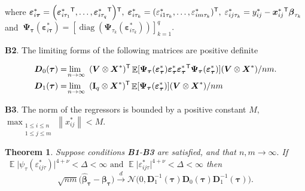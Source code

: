 \documentclass[15pt,a4paper]{article}
\DeclareMathOperator{\E}{\mathbb{E}}
\DeclareMathOperator{\diag}{diag}
\newcommand{\norm}[1]{\left\lVert#1\right\rVert}
\newcommand{\transpose}{{}^{\text{\sffamily T}}}
\newtheorem{theorem}{Theorem}%
\begin{document}
where  $\boldsymbol{\varepsilon}_{i\boldsymbol{\tau}}^{*}=\Big(\boldsymbol{\varepsilon}_{i\tau_1}^{*}\transpose,\ldots,\boldsymbol{\varepsilon}_{i\tau_q}^{*}\transpose\Big)\transpose, \; \boldsymbol{\varepsilon}_{i\tau_k}^{*}=(\varepsilon_{i1\tau_k}^{*},\ldots,\varepsilon_{im\tau_k}^{*})\transpose, \; \varepsilon_{ij\tau_k}^{*}=y_{ij}^{*}-\boldsymbol{x}_{ij}^{*}\transpose\boldsymbol{\beta}_{\tau_k} \ $ and
$ \ \boldsymbol{\Psi}_{\boldsymbol{\tau}}(\boldsymbol{\varepsilon}_{i\boldsymbol{\tau}}^{*})=
[\diag(\boldsymbol{\Psi}_{\tau_k}(\boldsymbol{\varepsilon}_{i{\tau_k}}^{*}))]_{k=1}^{q}.$

\textbf{B2}. The limiting forms of the following matrices are positive definite

\begin{equation*}
\begin{split}
    {}& \boldsymbol{D}_0 (\boldsymbol{\tau})= \lim_{\substack{ \mathllap{n} \rightarrow \mathrlap{\infty} }} \quad
     (\boldsymbol{V}\otimes\boldsymbol{X}^{*})\transpose\E[\boldsymbol{\Psi}_{\boldsymbol{\tau}}(\boldsymbol{\varepsilon}_{\boldsymbol{\tau}}^{*})
     \boldsymbol{\varepsilon}_{\boldsymbol{\tau}}^{*}\boldsymbol{\varepsilon}_{\boldsymbol{\tau}}^{*}\transpose
    \boldsymbol{\Psi}_{\boldsymbol{\tau}}(\boldsymbol{\varepsilon}_{\boldsymbol{\tau}}^{*})](\boldsymbol{V}\otimes\boldsymbol{X}^{*})/nm. \\
    {}& \boldsymbol{D}_1 (\boldsymbol{\tau})= \lim_{\substack{ \mathllap{n} \rightarrow \mathrlap{\infty} }} \quad
     (\mathbf{I}_q\otimes\boldsymbol{X}^{*})\transpose\E[\boldsymbol{\Psi}_{\boldsymbol{\tau}}(\boldsymbol{\varepsilon}_{\boldsymbol{\tau}}^{*})](\boldsymbol{V}\otimes\boldsymbol{X}^{*})/nm \\
\end{split}
\end{equation*}

\textbf{B3}. The norm of the regressors is bounded by a positive constant $M, \ $ \(\max_{\substack{ 1\leq i \leq n \\ 1 \leq j \leq m} }\norm{x_{ij}^{*}} < M.\) 

\begin{theorem}\label{theo2_erfe}
Suppose conditions \textbf{B1}-\textbf{B3} are satisfied, and that $n,m\rightarrow\infty.$ If $\; \E\lvert \psi_{\tau}(\varepsilon_{ij\tau}^{*})\rvert^{4+\nu}<\Delta<\infty \mbox{ and }\E\lvert \varepsilon_{ij\tau}^{*} \rvert^{4+\nu}<\Delta<\infty$  then 
\begin{equation*}
 \sqrt{nm}\big(\widehat{\boldsymbol{\beta}}_{\boldsymbol{\tau}}-
    \boldsymbol{\beta}_{\boldsymbol{\tau}}\big)\xrightarrow{d} 
    \mathcal{N}\bigg(0,    \boldsymbol{D}_1^{-1}(\boldsymbol{\tau})
    \boldsymbol{D}_0(\boldsymbol{\tau})\boldsymbol{D}_1^{-1}
    (\boldsymbol{\tau})\bigg).
\end{equation*}
\end{theorem}
\end{document}
